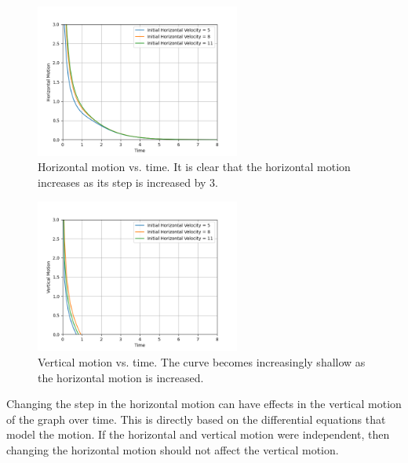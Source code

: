 \documentclass[12pt]{iopart} %
\begin{document}
\begin{figure}[h!tbp]
  \begin{center}
 \item[]\includegraphics[width=0.6\textwidth]{figure1.png}
  \caption{\label{fig:figure1}
  Horizontal motion vs. time. 
  It is clear that the horizontal motion increases as its step is increased by 3.
  }
  \end{center}
\end{figure}

\begin{figure}[h!tbp]
  \begin{center}
 \item[]\includegraphics[width=0.6\textwidth]{figure2.png}
  \caption{\label{fig:figure2}
  Vertical motion vs. time. 
  The curve becomes increasingly shallow as the horizontal motion is increased.
  }
  \end{center}
\end{figure}

Changing the step in the horizontal motion can have effects in the vertical motion of the graph over time. 
This is directly based on the differential equations that model the motion. 
If the horizontal and vertical motion were independent, then changing the horizontal motion should not affect the vertical motion.

\pagebreak
\end{document}
